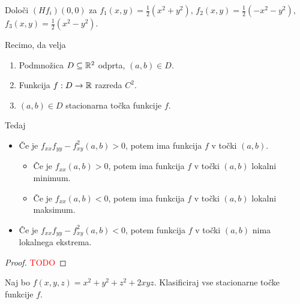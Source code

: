 \begin{zgled}
    Določi $(Hf_i)(0,0)$ za $f_1(x,y) = \frac{1}{2}(x^2+y^2)$, $f_2(x,y) = \frac{1}{2}(-x^2-y^2)$, $f_3(x,y) = \frac{1}{2}(x^2-y^2)$.
\end{zgled}

\begin{posledica}[Zadostni pogoji, $n=2$]
    Recimo, da velja
    \begin{enumerate}
        \item Podmnožica $D \subseteq \mathbb{R}^2$ odprta, $(a, b) \in D$.
        \item Funkcija $f: D \to \mathbb{R}$ razreda $C^2$.
        \item $(a, b) \in D$ stacionarna točka funkcije $f$.    
    \end{enumerate}
    Tedaj
    \begin{itemize}
        \item Če je $f_{xx}f_{yy} - f_{xy}^2(a,b) > 0$, potem ima funkcija $f$ v točki $(a, b)$.
        \begin{itemize}
            \item Če je $f_{xx}(a,b)>0$, potem ima funkcija $f$ v točki $(a,b)$ lokalni minimum.
            \item Če je $f_{xx}(a,b)<0$, potem ima funkcija $f$ v točki $(a,b)$ lokalni maksimum.
        \end{itemize}
        \item Če je $f_{xx}f_{yy} - f_{xy}^2(a,b) < 0$, potem funkcija $f$ v točki $(a, b)$ nima lokalnega ekstrema.
    \end{itemize}
\end{posledica}

\begin{proof}
    \textcolor{red}{TODO}
\end{proof}

\begin{zgled}
    Naj bo $f(x,y,z) = x^2+y^2+z^2 + 2xyz$. Klasificiraj vse stacionarne točke funkcije $f$.
\end{zgled}

